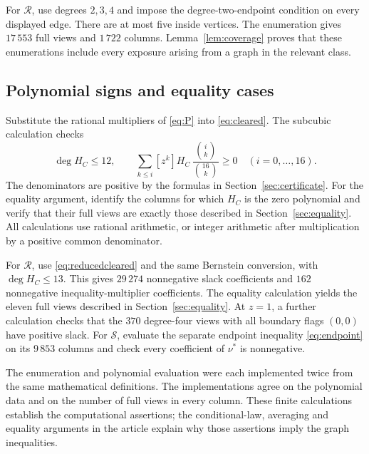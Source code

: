 \documentclass[11pt]{article}
\begin{document}
For $\mathcal R$, use degrees $2,3,4$ and impose the degree-two-endpoint condition on every displayed edge. There are at most five inside vertices. The enumeration gives $17\,553$ full views and $1\,722$ columns. Lemma~\ref{lem:coverage} proves that these enumerations include every exposure arising from a graph in the relevant class.

\subsection{Polynomial signs and equality cases}
Substitute the rational multipliers of \eqref{eq:P} into \eqref{eq:cleared}. The subcubic calculation checks
\[
 \deg H_C\le12,\qquad
 \sum_{k\le i}[z^k]H_C\,\frac{\binom{i}{k}}{\binom{16}{k}}\ge0
 \quad(i=0,\ldots,16).
\]
The denominators are positive by the formulas in Section~\ref{sec:certificate}. For the equality argument, identify the columns for which $H_C$ is the zero polynomial and verify that their full views are exactly those described in Section~\ref{sec:equality}. All calculations use rational arithmetic, or integer arithmetic after multiplication by a positive common denominator.


For $\mathcal R$, use \eqref{eq:reducedcleared} and the same Bernstein conversion, with $\deg H_C\le13$. This gives $29\,274$ nonnegative slack coefficients and $162$ nonnegative inequality-multiplier coefficients. The equality calculation yields the eleven full views described in Section~\ref{sec:equality}. At $z=1$, a further calculation checks that the $370$ degree-four views with all boundary flags $(0,0)$ have positive slack. For $\mathcal S$, evaluate the separate endpoint inequality \eqref{eq:endpoint} on its $9\,853$ columns and check every coefficient of $\nu^{\ast}$ is nonnegative.

The enumeration and polynomial evaluation were each implemented twice from the same mathematical definitions. The implementations agree on the polynomial data and on the number of full views in every column. These finite calculations establish the computational assertions; the conditional-law, averaging and equality arguments in the article explain why those assertions imply the graph inequalities.
\end{document}
